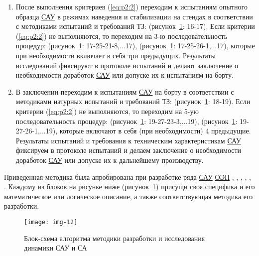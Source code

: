\begin{enumerate}
	\item После выполнения критериев (\ref{eq:p2:2}) переходим к испытаниям опытного образца \hyperref[acroSAU]{САУ} в режимах наведения и стабилизации на стендах в соответствии с методиками испытаний и требований ТЗ: (рисунок~\ref{fig:tikz_example}: 16-17). Если критерии (\ref{eq:p2:2}) не выполняются, то переходим на 
	3-ю последовательность процедур: (рисунок~\ref{fig:tikz_example}: 17-25-21-8,...17), (рисунок~\ref{fig:tikz_example}: 17-25-26-1,...17), которые при необходимости включает в себя три предыдущих. Результаты исследований фиксируют в протоколе испытаний и делают заключение о необходимости доработок \hyperref[acroSAU]{САУ} или допуске их к испытаниям на борту. 
	
	\item В заключении переходим к испытаниям \hyperref[acroSAU]{САУ} на борту в соответствии с методиками натурных испытаний и требований ТЗ: (рисунок~\ref{fig:tikz_example}: 18-19). Если критерии (\ref{eq:p2:2}) не выполняются, то переходим на 5-ую последовательность процедур: (рисунок~\ref{fig:tikz_example}: 19-27-23-3,...19), (рисунок~\ref{fig:tikz_example}: 19-27-26-1,...19), которые включают в себя (при необходимости) 4 предыдущие. Результаты испытаний и требования к техническим характеристикам \hyperref[acroSAU]{САУ} фиксируем в протоколе испытаний и делаем заключение о необходимости доработок \hyperref[acroSAU]{САУ} или допуске их к дальнейшему производству.
	
\end{enumerate}

Приведенная методика была апробирована при разработке ряда \hyperref[acroSAU]{САУ} \hyperref[acroEOS]{ОЭП} \cite[]{Belyakov}, \cite[]{Karpov}, \cite[]{Baloev16}, \cite[]{Karpov17}, \cite[]{Gerasin19}, \cite[]{Molin21}. Каждому из блоков на рисунке ниже (рисунок~\ref{fig:tikz_example}) присущи своя специфика и его математическое или логическое описание, а также соответствующая методика его разработки.

\begin{figure}[ht]
	\centering
	\texttt{[image: img-12]} 
	\caption{Блок-схема алгоритма методики разработки и исследования динамики САУ и СА}
	\label{fig:tikz_example}
\end{figure}

\newpage

